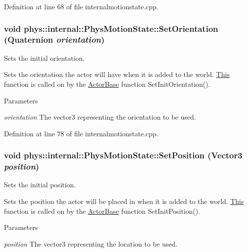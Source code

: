 Definition at line 68 of file internalmotionstate.cpp.

\hypertarget{classphys_1_1internal_1_1PhysMotionState_a5beba7c161a09b90b5a301585a509be6}{
\subsubsection[{SetOrientation}]{\setlength{\rightskip}{0pt plus 5cm}void phys::internal::PhysMotionState::SetOrientation ({\bf Quaternion} {\em orientation})}}
\label{dc/df8/classphys_1_1internal_1_1PhysMotionState_a5beba7c161a09b90b5a301585a509be6}


Sets the initial orientation. 

Sets the orientation the actor will have when it is added to the world. \hyperlink{structThis}{This} function is called on by the \hyperlink{classphys_1_1ActorBase}{ActorBase} function SetInitOrientation(). 
\begin{DoxyParams}{Parameters}
\item[{\em orientation}]The vector3 representing the orientation to be used. \end{DoxyParams}


Definition at line 78 of file internalmotionstate.cpp.

\hypertarget{classphys_1_1internal_1_1PhysMotionState_ad5c5142565ce4b5cd52d2f377ce4da10}{
\subsubsection[{SetPosition}]{\setlength{\rightskip}{0pt plus 5cm}void phys::internal::PhysMotionState::SetPosition ({\bf Vector3} {\em position})}}
\label{dc/df8/classphys_1_1internal_1_1PhysMotionState_ad5c5142565ce4b5cd52d2f377ce4da10}


Sets the initial position. 

Sets the position the actor will be placed in when it is added to the world. \hyperlink{structThis}{This} function is called on by the \hyperlink{classphys_1_1ActorBase}{ActorBase} function SetInitPosition(). 
\begin{DoxyParams}{Parameters}
\item[{\em position}]The vector3 representing the location to be used. \end{DoxyParams}



